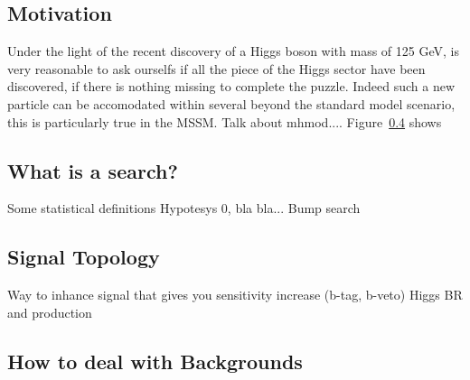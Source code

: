 \subsection{Motivation}
Under the light of the recent discovery of a Higgs boson with mass of 125 GeV, is very reasonable
to ask ourselfs if all the piece of the Higgs sector have been discovered, if there is nothing missing
to complete the puzzle. Indeed such a new particle can be accomodated within several beyond the 
standard model scenario, this is particularly true in the MSSM. 
Talk about mhmod....
Figure~\ref{} shows 

\subsection{What is a search?} 
Some statistical definitions Hypotesys 0, bla bla...
Bump search

\subsection{Signal Topology}
Way to inhance signal that gives you sensitivity increase (b-tag, b-veto)
Higgs BR and production

\subsection{How to deal with Backgrounds}

